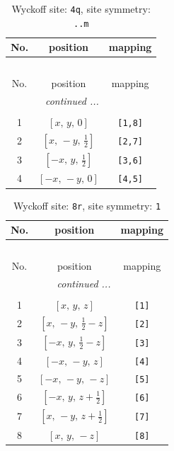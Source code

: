\documentclass[fleqn,8pt]{jsarticle}
\begin{document}
\renewcommand{\arraystretch}{1.2}
\begin{longtable}{ccc}
\caption{Wyckoff site: {\tt 4q}, site symmetry: {\tt ..m}}
 \\
 \hline \hline
No. & position & mapping \\ \hline \endfirsthead

\multicolumn{2}{l}{\tablename\ \thetable{}} \\
 \hline \hline
No. & position & mapping \\ \hline \endhead

 \hline \hline
\multicolumn{2}{r}{\footnotesize\it continued ...} \\ \endfoot

 \hline \hline
\multicolumn{2}{r}{} \\ \endlastfoot

1 & $\left[ x,\, y,\, 0 \right]$ & {\tt [1,8]} \\ \hline
2 & $\left[ x,\, - y,\, \frac{1}{2} \right]$ & {\tt [2,7]} \\ \hline
3 & $\left[ - x,\, y,\, \frac{1}{2} \right]$ & {\tt [3,6]} \\ \hline
4 & $\left[ - x,\, - y,\, 0 \right]$ & {\tt [4,5]} \\
\end{longtable}
\renewcommand{\arraystretch}{1.2}
\begin{longtable}{ccc}
\caption{Wyckoff site: {\tt 8r}, site symmetry: {\tt 1}}
 \\
 \hline \hline
No. & position & mapping \\ \hline \endfirsthead

\multicolumn{2}{l}{\tablename\ \thetable{}} \\
 \hline \hline
No. & position & mapping \\ \hline \endhead

 \hline \hline
\multicolumn{2}{r}{\footnotesize\it continued ...} \\ \endfoot

 \hline \hline
\multicolumn{2}{r}{} \\ \endlastfoot

1 & $\left[ x,\, y,\, z \right]$ & {\tt [1]} \\ \hline
2 & $\left[ x,\, - y,\, \frac{1}{2} - z \right]$ & {\tt [2]} \\ \hline
3 & $\left[ - x,\, y,\, \frac{1}{2} - z \right]$ & {\tt [3]} \\ \hline
4 & $\left[ - x,\, - y,\, z \right]$ & {\tt [4]} \\ \hline
5 & $\left[ - x,\, - y,\, - z \right]$ & {\tt [5]} \\ \hline
6 & $\left[ - x,\, y,\, z + \frac{1}{2} \right]$ & {\tt [6]} \\ \hline
7 & $\left[ x,\, - y,\, z + \frac{1}{2} \right]$ & {\tt [7]} \\ \hline
8 & $\left[ x,\, y,\, - z \right]$ & {\tt [8]} \\
\end{longtable}
\end{document}
